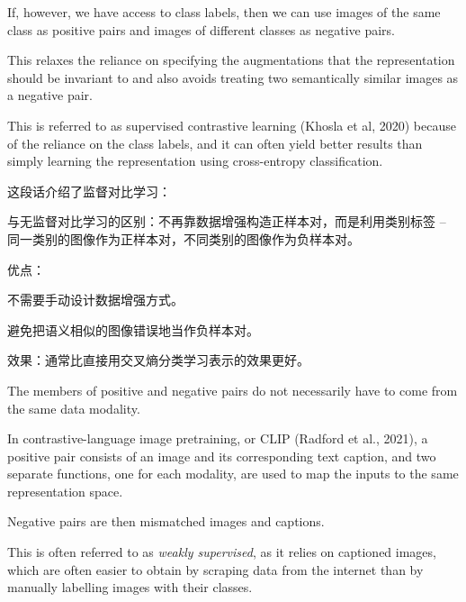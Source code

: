 \documentclass{article}
\begin{document}
If, however, we have access to class labels, then we can use images of the same class as positive pairs and images of different classes as negative pairs. 

This relaxes the reliance on specifying the augmentations that the representation should be invariant to and also avoids treating two semantically similar images as a negative pair. 

This is referred to as supervised contrastive learning (Khosla et al, 2020) because of the reliance on the class labels, and it can often yield better results than simply learning the representation using cross-entropy classification.

{\color{red}
这段话介绍了监督对比学习：

与无监督对比学习的区别：不再靠数据增强构造正样本对，而是利用类别标签 -- 同一类别的图像作为正样本对，不同类别的图像作为负样本对。

优点：

不需要手动设计数据增强方式。

避免把语义相似的图像错误地当作负样本对。

效果：通常比直接用交叉熵分类学习表示的效果更好。

}

The members of positive and negative pairs do not necessarily have to come from the same data modality. 

In contrastive-language image pretraining, or CLIP (Radford et al., 2021), a positive pair consists of an image and its corresponding text caption, and two separate functions, one for each modality, are used to map the inputs to the same representation space. 

Negative pairs are then mismatched images and captions. 

This is often referred to as \emph{weakly supervised}, as it relies on captioned images, which are often easier to obtain by scraping data from the internet than by manually labelling images with their classes. 
\end{document}
